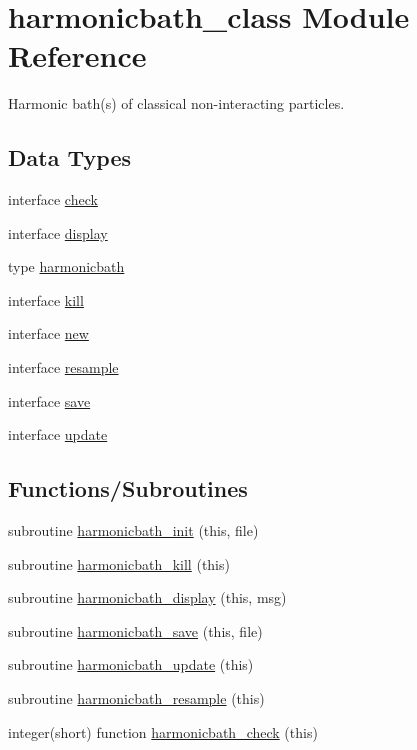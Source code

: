 \hypertarget{namespaceharmonicbath__class}{}\section{harmonicbath\+\_\+class Module Reference}
\label{namespaceharmonicbath__class}


Harmonic bath(s) of classical non-\/interacting particles.  


\subsection*{Data Types}
\begin{DoxyCompactItemize}
\item 
interface \hyperlink{interfaceharmonicbath__class_1_1check}{check}
\item 
interface \hyperlink{interfaceharmonicbath__class_1_1display}{display}
\item 
type \hyperlink{structharmonicbath__class_1_1harmonicbath}{harmonicbath}
\item 
interface \hyperlink{interfaceharmonicbath__class_1_1kill}{kill}
\item 
interface \hyperlink{interfaceharmonicbath__class_1_1new}{new}
\item 
interface \hyperlink{interfaceharmonicbath__class_1_1resample}{resample}
\item 
interface \hyperlink{interfaceharmonicbath__class_1_1save}{save}
\item 
interface \hyperlink{interfaceharmonicbath__class_1_1update}{update}
\end{DoxyCompactItemize}
\subsection*{Functions/\+Subroutines}
\begin{DoxyCompactItemize}
\item 
subroutine \hyperlink{namespaceharmonicbath__class_a7d869bb99a49aa520fe606e808d5feb5}{harmonicbath\+\_\+init} (this, file)
\item 
subroutine \hyperlink{namespaceharmonicbath__class_ae4e0e1b027594bb77034f21e82f6ed63}{harmonicbath\+\_\+kill} (this)
\item 
subroutine \hyperlink{namespaceharmonicbath__class_af4ce5a2a61231e5612ff243262e9f993}{harmonicbath\+\_\+display} (this, msg)
\item 
subroutine \hyperlink{namespaceharmonicbath__class_a9dfb6e87e69957fcc4ec907135931ace}{harmonicbath\+\_\+save} (this, file)
\item 
subroutine \hyperlink{namespaceharmonicbath__class_ac930ca08461d767f4593374465c7229d}{harmonicbath\+\_\+update} (this)
\item 
subroutine \hyperlink{namespaceharmonicbath__class_a6b27afcc7c1f24fec82adf3177d0adb8}{harmonicbath\+\_\+resample} (this)
\item 
integer(short) function \hyperlink{namespaceharmonicbath__class_abde7a862edc5c843e0665c6a6705bd74}{harmonicbath\+\_\+check} (this)
\end{DoxyCompactItemize}


